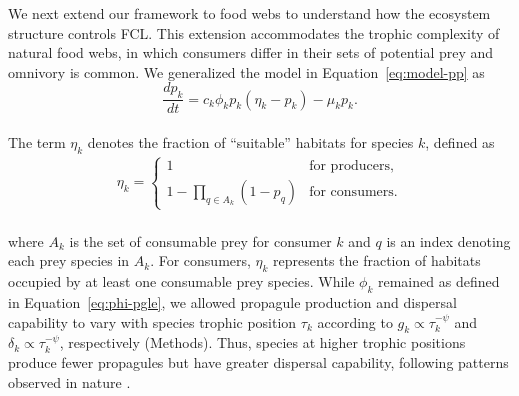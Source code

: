 \documentclass[9pt,twocolumn,twoside]{pnas-new}
\begin{document}
We next extend our framework to food webs to understand how the ecosystem structure controls FCL.
This extension accommodates the trophic complexity of natural food webs, in which consumers differ in their sets of potential prey and omnivory is common.
We generalized the model in Equation~\ref{eq:model-pp} as
\\
\begin{equation}
    \frac{dp_k}{dt} = c_{k} \phi_k p_k (\eta_k - p_k) - \mu_k p_k.
    \label{eq:model-fw}
\end{equation}
\\
The term $\eta_k$ denotes the fraction of ``suitable'' habitats for species $k$, defined as
\\
\begin{align}
    \eta_k 
    = 
    \begin{cases}
        1 &\text{for producers},\\
        1 - \prod_{q \in A_k}(1-p_q) &\text{for consumers.}
    \end{cases}
    \label{eq:eta}
\end{align}
\\
where $A_k$ is the set of consumable prey for consumer $k$ and $q$ is an index denoting each prey species in $A_k$.
For consumers, $\eta_k$ represents the fraction of habitats occupied by at least one consumable prey species. 
While $\phi_k$ remained as defined in Equation~\ref{eq:phi-pgle}, we allowed propagule production and dispersal capability to vary with species trophic position $\tau_k$ according to $g_k \propto \tau_k^{-\psi}$ and $\delta_k \propto \tau_k^{-\psi}$, respectively (Methods). 
Thus, species at higher trophic positions produce fewer propagules but have greater dispersal capability, following patterns observed in nature \cite{finlay_stream_2011, mccann_dynamics_2005}.
\end{document}
